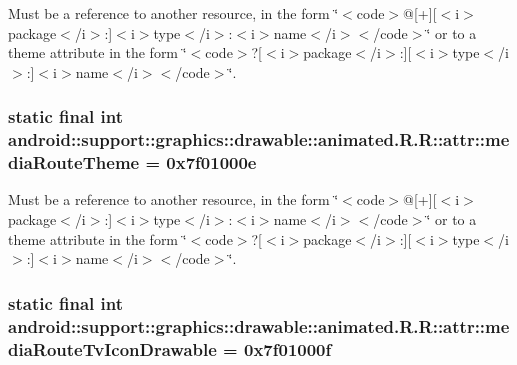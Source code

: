 Must be a reference to another resource, in the form \char`\"{}$<$code$>$@\mbox{[}+\mbox{]}\mbox{[}$<$i$>$package$<$/i$>$:\mbox{]}$<$i$>$type$<$/i$>$:$<$i$>$name$<$/i$>$$<$/code$>$\char`\"{} or to a theme attribute in the form \char`\"{}$<$code$>$?\mbox{[}$<$i$>$package$<$/i$>$:\mbox{]}\mbox{[}$<$i$>$type$<$/i$>$:\mbox{]}$<$i$>$name$<$/i$>$$<$/code$>$\char`\"{}. \hypertarget{classandroid_1_1support_1_1graphics_1_1drawable_1_1animated_1_1_r_1_1attr_54ee972efe4190093a454b0fb0d965d0}{
\subsubsection[{mediaRouteTheme}]{\setlength{\rightskip}{0pt plus 5cm}static final int android::support::graphics::drawable::animated.R.R::attr::mediaRouteTheme = 0x7f01000e}}
\label{classandroid_1_1support_1_1graphics_1_1drawable_1_1animated_1_1_r_1_1attr_54ee972efe4190093a454b0fb0d965d0}


Must be a reference to another resource, in the form \char`\"{}$<$code$>$@\mbox{[}+\mbox{]}\mbox{[}$<$i$>$package$<$/i$>$:\mbox{]}$<$i$>$type$<$/i$>$:$<$i$>$name$<$/i$>$$<$/code$>$\char`\"{} or to a theme attribute in the form \char`\"{}$<$code$>$?\mbox{[}$<$i$>$package$<$/i$>$:\mbox{]}\mbox{[}$<$i$>$type$<$/i$>$:\mbox{]}$<$i$>$name$<$/i$>$$<$/code$>$\char`\"{}. \hypertarget{classandroid_1_1support_1_1graphics_1_1drawable_1_1animated_1_1_r_1_1attr_9045b883b1cd42e854a47e9ccb6207b2}{
\subsubsection[{mediaRouteTvIconDrawable}]{\setlength{\rightskip}{0pt plus 5cm}static final int android::support::graphics::drawable::animated.R.R::attr::mediaRouteTvIconDrawable = 0x7f01000f}}
\label{classandroid_1_1support_1_1graphics_1_1drawable_1_1animated_1_1_r_1_1attr_9045b883b1cd42e854a47e9ccb6207b2}


